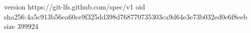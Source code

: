 version https://git-lfs.github.com/spec/v1
oid sha256:4a5c913b56ea60ce9f325dd398d768770735303ca9d64e3e73b032ed0e6f8eeb
size 399924
